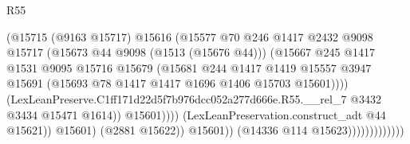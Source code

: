 \begin{lexlean}{R55}
\begin{coremodule}
{{                                              (@15715
                                                (@9163 @15717)
                                                @15616
                                                (@15577
                                                  @70
                                                  @246
                                                  @1417
                                                  @2432
                                                  @9098
                                                  @15717
                                                  (@15673 @44 @9098 (@1513 (@15676 @44)))
                                                  (@15667
                                                    @245
                                                    @1417
                                                    @1531
                                                    @9095
                                                    @15716
                                                    @15679
                                                    (@15681
                                                      @244
                                                      @1417
                                                      @1419
                                                      @15557
                                                      @3947
                                                      @15691
                                                      (@15693
                                                        @78
                                                        @1417
                                                        @1417
                                                        @1696
                                                        @1406
                                                        @15703
                                                        @15601))))
                                                (LexLeanPreserve.C1ff171d22d5f7b976dcc052a277d666e.R55.__rel_7
                                                  @3432
                                                  @3434
                                                  @15471
                                                  @1614))
                                              @15601))))
                                      (LexLeanPreservation.construct_adt @44 @15621))
                                    @15601)
                                  (@2881 @15622))
                                @15601))
                            (@14336 @114 @15623)))))))))))))
}}
\end{coremodule}
\end{lexlean}
